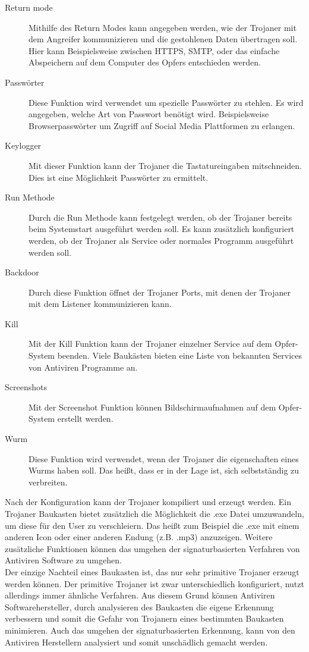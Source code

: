 \begin{description}
\item[Return mode] Mithilfe des Return Modes kann angegeben werden, wie der Trojaner mit dem Angreifer kommunizieren und die gestohlenen Daten übertragen soll. 
        Hier kann Beispielsweise zwischen HTTPS, SMTP, oder das einfache Abspeichern auf dem Computer des Opfers entschieden werden.
\item[Passwörter] Diese Funktion wird verwendet um spezielle Passwörter zu stehlen. Es wird angegeben, welche Art von Passwort benötigt wird. Beispielsweise Browserpasswörter um Zugriff auf Social Media Plattformen zu erlangen.
\item[Keylogger] Mit dieser Funktion kann der Trojaner die Tastatureingaben mitschneiden. Dies ist eine Möglichkeit Passwörter zu ermittelt.
\item[Run Methode] Durch die Run Methode kann festgelegt werden, ob der Trojaner bereits beim Systemstart ausgeführt werden soll. Es kann zusätzlich konfiguriert werden, ob der Trojaner als Service oder normales Programm ausgeführt werden soll.
\item[Backdoor] Durch diese Funktion öffnet der Trojaner Ports, mit denen der Trojaner mit dem Listener kommunizieren kann.
\item[Kill] Mit der Kill Funktion kann der Trojaner einzelner Service auf dem Opfer-System beenden. Viele Baukästen bieten eine Liste von bekannten Services von Antiviren Programme an.
\item[Screenshots] Mit der Screenshot Funktion können Bildschirmaufnahmen auf dem Opfer-System erstellt werden.
\item[Wurm] Diese Funktion wird verwendet, wenn der Trojaner die eigenschaften eines Wurms haben soll. Das heißt, dass er in der Lage ist, sich selbstständig zu verbreiten.
\end{description}
Nach der Konfiguration kann der Trojaner kompiliert und erzeugt werden. 
Ein Trojaner Baukasten bietet zusätzlich die Möglichkeit die .exe Datei umzuwandeln, um diese für den User zu verschleiern. 
Das heißt zum Beispiel die .exe mit einem anderen Icon oder einer anderen Endung (z.B. .mp3) anzuzeigen. 
Weitere zusätzliche Funktionen können das umgehen der signaturbasierten Verfahren von Antiviren Software zu umgehen.\\
Der einzige Nachteil eines Baukasten ist, das nur sehr primitive Trojaner erzeugt werden können. 
Der primitive Trojaner ist zwar unterschiedlich konfiguriert, nutzt allerdings immer ähnliche Verfahren. 
Aus diesem Grund können Antiviren Softwarehersteller, durch analysieren des Baukasten die eigene Erkennung verbessern und somit die Gefahr von Trojanern eines bestimmten Baukasten minimieren. 
Auch das umgehen der signaturbasierten Erkennung, kann von den Antiviren Herstellern analysiert und somit unschädlich gemacht werden\cite{FOCUS}.
